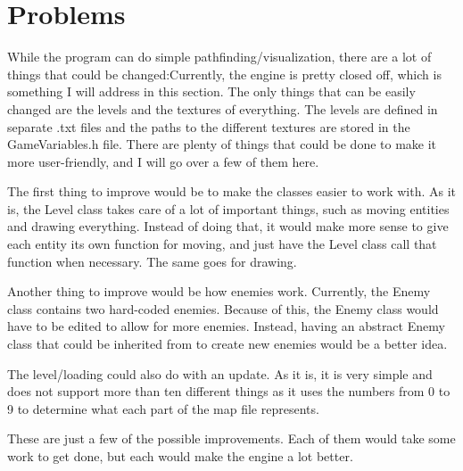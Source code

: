 \section{Problems}
\label{04}

While the program can do simple pathfinding/visualization, there are a lot of things that could be changed:Currently, the engine is pretty closed off, which is something I will address in this section. The only things that can be easily changed are the levels and the textures of everything. The levels are defined in separate .txt files and the paths to the different textures are stored in the GameVariables.h file. There are plenty of things that could be done to make it more user-friendly, and I will go over a few of them here.

The first thing to improve would be to make the classes easier to work with. As it is, the Level class takes care of a lot of important things, such as moving entities and drawing everything. Instead of doing that, it would make more sense to give each entity its own function for moving, and just have the Level class call that function when necessary. The same goes for drawing.

Another thing to improve would be how enemies work. Currently, the Enemy class contains two hard-coded enemies. Because of this, the Enemy class would have to be edited to allow for more enemies. Instead, having an abstract Enemy class that could be inherited from to create new enemies would be a better idea.

The level/loading could also do with an update. As it is, it is very simple and does not support more than ten different things as it uses the numbers from 0 to 9 to determine what each part of the map file represents.

These are just a few of the possible improvements. Each of them would take some work to get done, but each would make the engine a lot better.